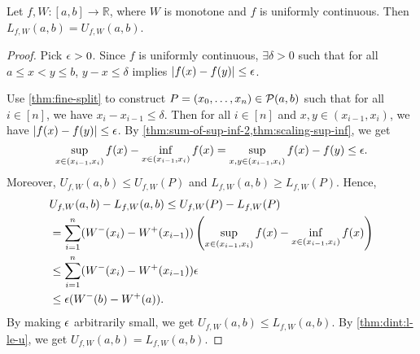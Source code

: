 \documentclass[a4paper,12pt,fleqn]{article}
\begin{document}
\begin{lemma}
\label{thm:dint:unif-cont}
Let $f, W: [a, b] \to \mathbb{R}$, where $W$ is monotone and $f$ is uniformly continuous.
Then $L_{f,W}(a, b) = U_{f,W}(a, b)$.
\end{lemma}
\begin{proof}
Pick $\epsilon > 0$. Since $f$ is uniformly continuous,
$\exists \delta > 0$ such that for all $a \le x < y \le b$,
$y - x \le \delta$ implies $|f(x) - f(y)| \le \epsilon$.

Use \cref{thm:fine-split} to construct
$P = (x_0, \ldots, x_n) \in \mathcal{P}(a, b)$ such that
for all $i \in [n]$, we have $x_i - x_{i-1} \le \delta$.
Then for all $i \in [n]$ and $x, y \in (x_{i-1}, x_i)$,
we have $|f(x) - f(y)| \le \epsilon$.
By \cref{thm:sum-of-sup-inf-2,thm:scaling-sup-inf}, we get
\[ \sup_{x \in (x_{i-1}, x_i)} f(x) - \inf_{x \in (x_{i-1}, x_i)} f(x)
    = \sup_{x, y \in (x_{i-1}, x_i)} f(x) - f(y) \le \epsilon. \]
%
Moreover, $U_{f,W}(a, b) \le U_{f,W}(P)$ and $L_{f,W}(a, b) \ge L_{f,W}(P)$. Hence,
\begin{align*}
& U_{f,W}(a, b) - L_{f,W}(a, b) \le U_{f,W}(P) - L_{f,W}(P)
\\ &= \sum_{i=1}^n (W^-(x_i) - W^+(x_{i-1}))
    \left(\sup_{x \in (x_{i-1}, x_i)} f(x) - \inf_{x \in (x_{i-1}, x_i)} f(x)\right)
\\ &\le \sum_{i=1}^n (W^-(x_i) - W^+(x_{i-1}))\epsilon
\\ &\le \epsilon(W^-(b) - W^+(a)).
\end{align*}
By making $\epsilon$ arbitrarily small, we get $U_{f,W}(a, b) \le L_{f,W}(a, b)$.
By \cref{thm:dint:l-le-u}, we get $U_{f,W}(a, b) = L_{f,W}(a, b)$.
\end{proof}
\end{document}
